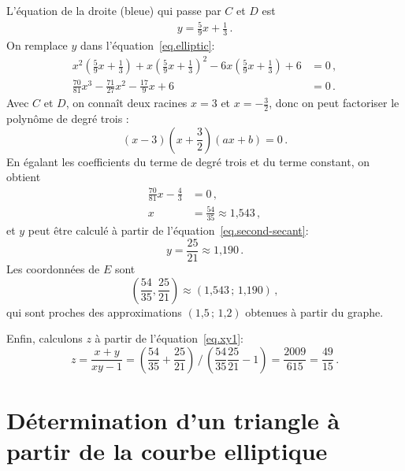 L'équation de la droite (bleue) qui passe par $C$ et $D$ est 
\begin{align}
y = \frac{5}{9}x + \frac{1}{3}\,.\label{eq.second-secant}
\end{align}
On remplace $y$ dans l'équation~\ref{eq.elliptic}:
\begin{align*}
x^2\left(\frac{5}{9}x + \frac{1}{3}\right) + x\left(\frac{5}{9}x + \frac{1}{3}\right)^2 -6x\left(\frac{5}{9}x + \frac{1}{3}\right) +6 &=0\,,\\
\frac{70}{81}x^3 - \frac{71}{27}x^2 - \frac{17}{9}x +6 &=0\,.
\end{align*}
Avec $C$ et $D$, on connaît deux racines $x=3$ et $x=-\frac{3}{2}$, donc on peut factoriser le polynôme de degré trois :
\[
(x-3)\left(x+\frac{3}{2}\right)(ax+b)=0\,.
\]
En égalant les coefficients du terme de degré trois et du terme constant, on obtient 
\begin{align*}
\frac{70}{81}x - \frac{4}{3}&=0\,,\\
x&= \frac{54}{35}\approx \mbox{1,543}\,,
\end{align*}
et $y$ peut être calculé à partir de l'équation~\ref{eq.second-secant}:
\[
y=\frac{25}{21}\approx \mbox{1,190}\,.
\]
Les coordonnées de $E$ sont 
\[
\left(\frac{54}{35}, \frac{25}{21}\right)\approx (\mbox{1,543}\,;\,\mbox{1,190})\,,
\]
qui sont proches des approximations $(\mbox{1,5}\,;\,\mbox{1,2})$ obtenues à partir du graphe.

Enfin, calculons $z$ à partir de l'équation~\ref{eq.xy1}:
\[
z=\frac{x+y}{xy-1}=%
\displaystyle\left(\frac{54}{35} + \frac{25}{21}\right)%
 \, \bigg/ \,%
\displaystyle\left(\frac{54}{35}\frac{25}{21}-1\right)=%
\frac{2009}{615} = \frac{49}{15}\,.
\]

\section{Détermination d'un triangle à partir de la courbe elliptique}

\enlargethispage*{\baselineskip}

